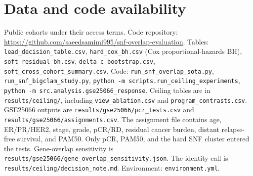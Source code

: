 \documentclass[11pt,a4paper]{article}
\begin{document}
\section{Data and code availability}
Public cohorts under their access terms. Code repository: \url{https://github.com/saeedsamimi995/snf-overlap-evaluation}. Tables: \texttt{lead\_decision\_table.csv}, \texttt{hard\_cox\_bh.csv} (Cox proportional-hazards BH), \texttt{soft\_residual\_bh.csv}, \texttt{delta\_c\_bootstrap.csv}, \texttt{soft\_cross\_cohort\_summary.csv}. Code: \texttt{run\_snf\_overlap\_sota.py}, \texttt{run\_snf\_bigclam\_study.py}, \texttt{python -m scripts.run\_ceiling\_experiments}, \texttt{python -m src.analysis.gse25066\_response}. Ceiling tables are in \texttt{results/ceiling/}, including \texttt{view\_ablation.csv} and \texttt{program\_contrasts.csv}. GSE25066 outputs are \texttt{results/gse25066/pcr\_tests.csv} and \texttt{results/gse25066/assignments.csv}. The assignment file contains age, ER/PR/HER2, stage, grade, pCR/RD, residual cancer burden, distant relapse-free survival, and PAM50. Only pCR, PAM50, and the hard SNF cluster entered the tests. Gene-overlap sensitivity is \texttt{results/gse25066/gene\_overlap\_sensitivity.json}. The identity call is \texttt{results/ceiling/decision\_note.md}. Environment: \texttt{environment.yml}.
\end{document}
